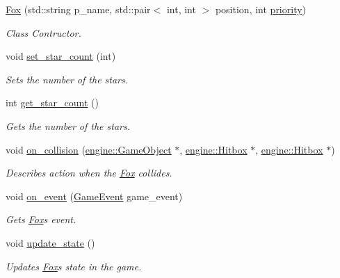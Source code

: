 \begin{DoxyCompactItemize}
\item 
\hyperlink{classmindscape_1_1_fox_a9c5e270000519e07ded5c549d16ad057}{Fox} (std\+::string p\+\_\+name, std\+::pair$<$ int, int $>$ position, int \hyperlink{classengine_1_1_game_object_a159ecaca30229e302793b11a75bd13c2}{priority})
\begin{DoxyCompactList}\small\item\em Class Contructor. \end{DoxyCompactList}\item 
void \hyperlink{classmindscape_1_1_fox_a6ee5b7c313ccc0d08fbf51ffddd09e72}{set\+\_\+star\+\_\+count} (int)
\begin{DoxyCompactList}\small\item\em Sets the number of the stars. \end{DoxyCompactList}\item 
int \hyperlink{classmindscape_1_1_fox_af8dc5d2ee06af247f7de5c7f374f20e5}{get\+\_\+star\+\_\+count} ()
\begin{DoxyCompactList}\small\item\em Gets the number of the stars. \end{DoxyCompactList}\item 
void \hyperlink{classmindscape_1_1_fox_a29feec4478a5d1440cfd901417fec6eb}{on\+\_\+collision} (\hyperlink{classengine_1_1_game_object}{engine\+::\+Game\+Object} $\ast$, \hyperlink{classengine_1_1_hitbox}{engine\+::\+Hitbox} $\ast$, \hyperlink{classengine_1_1_hitbox}{engine\+::\+Hitbox} $\ast$)
\begin{DoxyCompactList}\small\item\em Describes action when the \hyperlink{classmindscape_1_1_fox}{Fox} collides. \end{DoxyCompactList}\item 
void \hyperlink{classmindscape_1_1_fox_a5a4a3bb811104e0f8e4e063bf5d1f3c4}{on\+\_\+event} (\hyperlink{class_game_event}{Game\+Event} game\+\_\+event)
\begin{DoxyCompactList}\small\item\em Gets \hyperlink{classmindscape_1_1_fox}{Fox}\textquotesingle{}s event. \end{DoxyCompactList}\item 
void \hyperlink{classmindscape_1_1_fox_aad5bf81351822350233f9da732db7cdd}{update\+\_\+state} ()
\begin{DoxyCompactList}\small\item\em Updates \hyperlink{classmindscape_1_1_fox}{Fox}\textquotesingle{}s state in the game. \end{DoxyCompactList}\item 

\end{DoxyCompactItemize}
